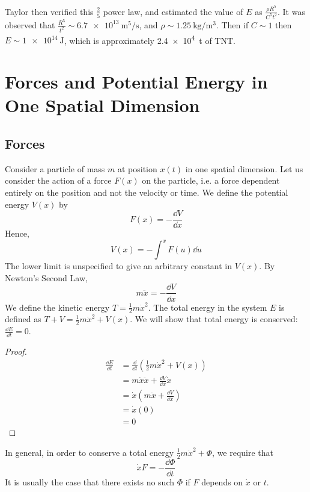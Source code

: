 \documentclass{article}
\begin{document}
Taylor then verified this $\frac{2}{5}$ power law, and estimated the value of $E$ as $\frac{\rho R^5}{C^5 t^2}$. It was observed that $\frac{R^5}{t^2} \sim \SI{6.7e13}{\metre\tothe{5}\per\second}$, and $\rho\sim\SI{1.25}{\kilogram\per\metre\cubed}$. Then if $C \sim 1$ then $E \sim \SI{1e14}{\joule}$, which is approximately \SI{2.4e4}{\tonne} of TNT.

\section{Forces and Potential Energy in One Spatial Dimension}
\subsection{Forces}
Consider a particle of mass $m$ at position $x(t)$ in one spatial dimension. Let us consider the action of a force $F(x)$ on the particle, i.e. a force dependent entirely on the position and not the velocity or time. We define the potential energy $V(x)$ by
\[ F(x) = -\frac{\dd{V}}{\dd{x}} \]
Hence,
\[ V(x) = - \int^x F(u) \dd{u} \]
The lower limit is unspecified to give an arbitrary constant in $V(x)$. By Newton's Second Law,
\[ m\ddot{x} = -\frac{\dd{V}}{\dd{x}} \]
We define the kinetic energy $T = \frac{1}{2}m\dot x^2$. The total energy in the system $E$ is defined as $T + V = \frac{1}{2} m \dot x^2 + V(x)$. We will show that total energy is conserved: $\frac{\dd{E}}{\dd{t}} = 0$.
\begin{proof}
	\begin{align*}
		\frac{\dd{E}}{\dd{t}} & = \frac{\dd}{\dd{t}}\left( \frac{1}{2}m\dot x^2 + V(x) \right) \\
		                      & = m\dot x \ddot x + \frac{\dd{V}}{\dd{x}} \dot x               \\
		                      & = \dot x\left( m \ddot x + \frac{\dd{V}}{\dd{x}} \right)       \\
		                      & = \dot x ( 0 )                                                 \\
		                      & = 0
	\end{align*}
\end{proof}
\noindent In general, in order to conserve a total energy $\frac{1}{2}m\dot x^2 + \Phi$, we require that
\[ \dot x F = -\frac{\dd \Phi}{\dd{t}} \]
It is usually the case that there exists no such $\Phi$ if $F$ depends on $\dot x$ or $t$.
\end{document}
